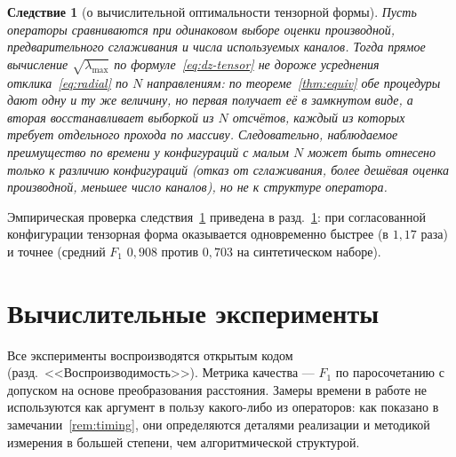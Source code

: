 \documentclass[11pt,a4paper]{article}
\theoremstyle{plain}
\newtheorem{corollary}{Следствие}
\theoremstyle{definition}
\theoremstyle{remark}
\newcommand{\lmax}{\lambda_{\max}}
\begin{document}
\begin{corollary}[о вычислительной оптимальности тензорной формы]
\label{cor:cost}
Пусть операторы сравниваются при одинаковом выборе оценки производной,
предварительного сглаживания и числа используемых каналов. Тогда прямое
вычисление $\sqrt{\lmax}$ по формуле~\eqref{eq:dz-tensor} не дороже
усреднения отклика~\eqref{eq:radial} по $N$ направлениям: по
теореме~\ref{thm:equiv} обе процедуры дают одну и ту же величину, но
первая получает её в замкнутом виде, а вторая восстанавливает выборкой из
$N$ отсчётов, каждый из которых требует отдельного прохода по массиву.
Следовательно, наблюдаемое преимущество по времени у конфигураций с малым
$N$ может быть отнесено только к различию конфигураций (отказ от
сглаживания, более дешёвая оценка производной, меньшее число каналов), но
не к структуре оператора.
\end{corollary}

Эмпирическая проверка следствия~\ref{cor:cost} приведена в
разд.~\ref{sec:exp}: при согласованной конфигурации тензорная форма
оказывается одновременно быстрее (в $1{,}17$ раза) и точнее (средний
$F_1$ $0{,}908$ против $0{,}703$ на синтетическом наборе).

\section{Вычислительные эксперименты}
\label{sec:exp}

Все эксперименты воспроизводятся открытым кодом (разд.~<<Воспроизводимость>>).
Метрика качества --- $F_1$ по паросочетанию с допуском на основе
преобразования расстояния. Замеры времени в работе не используются как
аргумент в пользу какого-либо из операторов: как показано в
замечании~\ref{rem:timing}, они определяются деталями реализации и
методикой измерения в большей степени, чем алгоритмической структурой.
\end{document}
